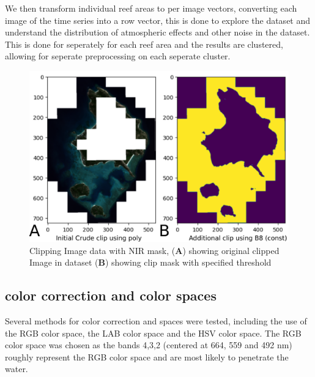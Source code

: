\documentclass[journal,article,submit,pdftex,moreauthors]{Definitions/mdpi}
\begin{document}
We then transform individual reef areas to per image vectors, converting each image of the time series into a row vector, this is done to explore the dataset and understand the distribution of 
atmospheric effects and other noise in the dataset. This is done for seperately for each reef area and the results are clustered, allowing for seperate preprocessing
on each seperate cluster. 


\begin{figure}
	\centering
	\includegraphics[width=0.7\linewidth]{Images/Preproc_Workflow.pdf}
	\caption{Clipping Image data with NIR mask, (\textbf{A}) showing original clipped Image in dataset (\textbf{B}) showing clip mask with specified threshold}
	\label{fig:PreprocWorkflow}
\end{figure}

\subsection*{color correction and color spaces}
Several methods for color correction and spaces were tested, including the use of the RGB color space, the LAB color space and the HSV color space. 
The RGB color space was chosen as the bands 4,3,2 (centered at 664, 559 and 492 nm) roughly represent the RGB color space and are most likely to penetrate the water.
\end{document}
